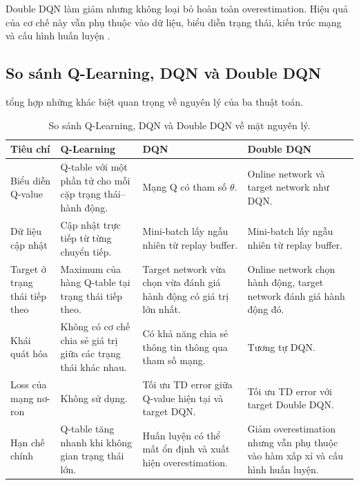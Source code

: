 Double DQN làm giảm nhưng không loại bỏ hoàn toàn overestimation. Hiệu quả của cơ chế này vẫn phụ thuộc vào dữ liệu, biểu diễn trạng thái, kiến trúc mạng và cấu hình huấn luyện \cite{VanHasselt2016}.

\subsection{So sánh Q-Learning, DQN và Double DQN}

 tổng hợp những khác biệt quan trọng về nguyên lý của ba thuật toán.

\begin{table}[H]
    \centering
    \renewcommand{\arraystretch}{1.25}
    \small
    \begin{tabular}{@{}
        >{\raggedright\arraybackslash}p{2.7cm}
        >{\raggedright\arraybackslash}p{3.5cm}
        >{\raggedright\arraybackslash}p{3.5cm}
        >{\raggedright\arraybackslash}p{3.5cm}
    @{}}
        \toprule
        \textbf{Tiêu chí} &
        \textbf{Q-Learning} &
        \textbf{DQN} &
        \textbf{Double DQN} \\
        \midrule
        Biểu diễn Q-value &
        Q-table với một phần tử cho mỗi cặp trạng thái--hành động. &
        Mạng Q có tham số $\theta$. &
        Online network và target network như DQN. \\

        Dữ liệu cập nhật &
        Cập nhật trực tiếp từ từng chuyển tiếp. &
        Mini-batch lấy ngẫu nhiên từ replay buffer. &
        Mini-batch lấy ngẫu nhiên từ replay buffer. \\

        Target ở trạng thái tiếp theo &
        Maximum của hàng Q-table tại trạng thái tiếp theo. &
        Target network vừa chọn vừa đánh giá hành động có giá trị lớn nhất. &
        Online network chọn hành động, target network đánh giá hành động đó. \\

        Khái quát hóa &
        Không có cơ chế chia sẻ giá trị giữa các trạng thái khác nhau. &
        Có khả năng chia sẻ thông tin thông qua tham số mạng. &
        Tương tự DQN. \\

        Loss của mạng nơ-ron &
        Không sử dụng. &
        Tối ưu TD error giữa Q-value hiện tại và target DQN. &
        Tối ưu TD error với target Double DQN. \\

        Hạn chế chính &
        Q-table tăng nhanh khi không gian trạng thái lớn. &
        Huấn luyện có thể mất ổn định và xuất hiện overestimation. &
        Giảm overestimation nhưng vẫn phụ thuộc vào hàm xấp xỉ và cấu hình huấn luyện. \\
        \bottomrule
    \end{tabular}
    \caption{So sánh Q-Learning, DQN và Double DQN về mặt nguyên lý.}
    \label{tab:algorithm-theory-comparison}
\end{table}

